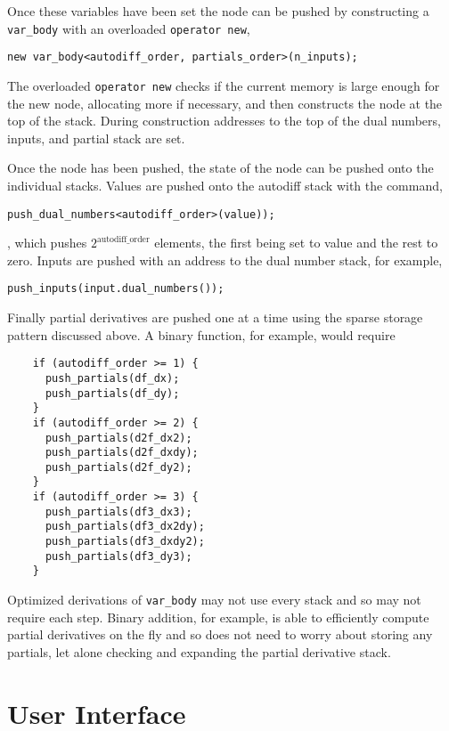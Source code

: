 Once these variables have been set the node can be pushed by constructing
a \verb|var_body| with an overloaded \verb|operator new|,
%
\begin{verbatim}
new var_body<autodiff_order, partials_order>(n_inputs);
\end{verbatim}
%
The overloaded \verb|operator new| checks if the current memory is large 
enough for the new node, allocating more if necessary, and then constructs 
the node at the top of the stack.  During construction addresses to the top of 
the dual numbers, inputs, and partial stack are set.

Once the node has been pushed, the state of the node can be pushed onto
the individual stacks.  Values are pushed onto the autodiff stack with the
command,
%
\begin{verbatim}
push_dual_numbers<autodiff_order>(value));
\end{verbatim},
%
which pushes $2^{\mathrm{autodiff\_order}}$ elements, the first being set to
value and the rest to zero.  Inputs are pushed with an address to the dual
number stack, for example,
%
\begin{verbatim}
push_inputs(input.dual_numbers());
\end{verbatim}
%
Finally partial derivatives are pushed one at a time using the sparse storage
pattern discussed above.  A binary function, for example, would require

%
\begin{verbatim}
    if (autodiff_order >= 1) {
      push_partials(df_dx);
      push_partials(df_dy);
    }
    if (autodiff_order >= 2) {
      push_partials(d2f_dx2);
      push_partials(d2f_dxdy);
      push_partials(d2f_dy2);
    }
    if (autodiff_order >= 3) {
      push_partials(df3_dx3);
      push_partials(df3_dx2dy);
      push_partials(df3_dxdy2);
      push_partials(df3_dy3);
    }
\end{verbatim}

Optimized derivations of \verb|var_body| may not use every stack and so may
not require each step.  Binary addition, for example, is able to efficiently 
compute partial derivatives on the fly and so does not need to worry about
storing any partials, let alone checking and expanding the partial derivative 
stack.

\section{User Interface} \label{sec:user_interface}

